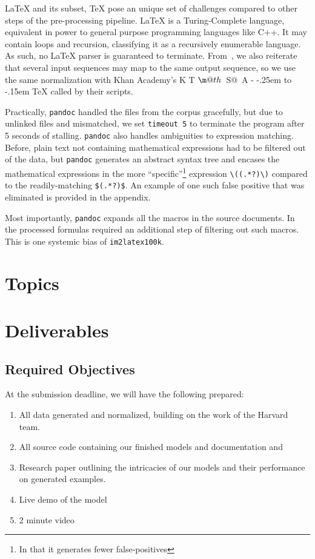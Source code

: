 \documentclass[]{article}
\makeatletter
\DeclareRobustCommand{\KaTeX}{K%
  {%
    \setbox0\hbox{T}%
    \setbox\@tempboxa\hbox{$\m@th$%
      \csname S@\f@size\endcsname
      \fontsize\sf@size\z@
      \math@fontsfalse\selectfont
      A}%
    \@tempdima\ht0
    \advance\@tempdima-\ht\@tempboxa
    \@tempdima\strip@pt\fontdimen1\font\@tempdima
    \advance\@tempdima-.25em
    \kern\@tempdima
    \vbox to\ht0{\box\@tempboxa
      \vss}%
  }%
  \kern-.15em
  \TeX}
\makeatother
\begin{document}
\LaTeX{} and its subset, \TeX{} pose an unique set of challenges compared to
other steps of the pre-processing pipeline. \LaTeX{} is a Turing-Complete
language, equivalent in power to general purpose programming languages like C++.
It may contain loops and recursion, classifying it as a recursively enumerable
language. As such, no \LaTeX{} parser is guaranteed to terminate.
From~\cite{deng2016you}, we also reiterate that several input sequences may map
to the same output sequence, so we use the same normalization with Khan
Academy's \KaTeX{} called by their scripts.

Practically, \texttt{pandoc} handled the files from the corpus gracefully, but
due to unlinked files and mismatched, we set \texttt{timeout 5} to terminate the
program after 5 seconds of stalling. \texttt{pandoc} also handles ambiguities to
expression matching. Before, plain text not containing mathematical expressions
had to be filtered out of the data, but \texttt{pandoc} generates an abstract
syntax tree and encases the mathematical expressions in the more
``specific''\footnote{In that it generates fewer false-positives} expression
\verb|\((.*?)\)| compared to the readily-matching \texttt{\$(.*?)\$}. An example
of one such false positive that was eliminated is provided in the
appendix. %

Most importantly, \texttt{pandoc} expands all the macros in the source
documents. In~\cite{deng2016you} the processed formulas required an additional
step of filtering out such macros. This is one systemic bias of
\texttt{im2latex100k}.

\section{Topics}

\section{Deliverables}

\subsection{Required Objectives}

At the submission deadline, we will have the following prepared:

\begin{enumerate}
\item All data generated and normalized, building on the work of the Harvard
  team.
\item All source code containing our finished models and documentation and
\item Research paper outlining the intricacies of our models and their
  performance on generated examples.
\item Live demo of the model
\item 2 minute video
\end{enumerate}
\end{document}
